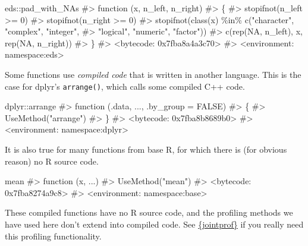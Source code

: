\documentclass[
  letterpaper,
  DIV=11,
  numbers=noendperiod]{scrreprt}
\newenvironment{Shaded}{\begin{snugshade}}{\end{snugshade}}
\newcommand{\CommentTok}[1]{\textcolor[rgb]{0.37,0.37,0.37}{#1}}
\newcommand{\NormalTok}[1]{\textcolor[rgb]{0.00,0.23,0.31}{#1}}
\newcommand{\SpecialCharTok}[1]{\textcolor[rgb]{0.37,0.37,0.37}{#1}}
\begin{document}
\begin{Shaded}
\begin{Highlighting}[]
\NormalTok{eds}\SpecialCharTok{::}\NormalTok{pad\_with\_NAs}
\CommentTok{\#\textgreater{} function (x, n\_left, n\_right) }
\CommentTok{\#\textgreater{} \{}
\CommentTok{\#\textgreater{}     stopifnot(n\_left \textgreater{}= 0)}
\CommentTok{\#\textgreater{}     stopifnot(n\_right \textgreater{}= 0)}
\CommentTok{\#\textgreater{}     stopifnot(class(x) \%in\% c("character", "complex", "integer", }
\CommentTok{\#\textgreater{}         "logical", "numeric", "factor"))}
\CommentTok{\#\textgreater{}     c(rep(NA, n\_left), x, rep(NA, n\_right))}
\CommentTok{\#\textgreater{} \}}
\CommentTok{\#\textgreater{} \textless{}bytecode: 0x7fba8a4a3c70\textgreater{}}
\CommentTok{\#\textgreater{} \textless{}environment: namespace:eds\textgreater{}}
\end{Highlighting}
\end{Shaded}

Some functions use \emph{compiled code} that is written in another
language. This is the case for dplyr's \texttt{arrange()}, which calls
some compiled C++ code.

\begin{Shaded}
\begin{Highlighting}[]
\NormalTok{dplyr}\SpecialCharTok{::}\NormalTok{arrange}
\CommentTok{\#\textgreater{} function (.data, ..., .by\_group = FALSE) }
\CommentTok{\#\textgreater{} \{}
\CommentTok{\#\textgreater{}     UseMethod("arrange")}
\CommentTok{\#\textgreater{} \}}
\CommentTok{\#\textgreater{} \textless{}bytecode: 0x7fba8b8689b0\textgreater{}}
\CommentTok{\#\textgreater{} \textless{}environment: namespace:dplyr\textgreater{}}
\end{Highlighting}
\end{Shaded}

It is also true for many functions from base R, for which there is (for
obvious reason) no R source code.

\begin{Shaded}
\begin{Highlighting}[]
\NormalTok{mean}
\CommentTok{\#\textgreater{} function (x, ...) }
\CommentTok{\#\textgreater{} UseMethod("mean")}
\CommentTok{\#\textgreater{} \textless{}bytecode: 0x7fba8274a9c8\textgreater{}}
\CommentTok{\#\textgreater{} \textless{}environment: namespace:base\textgreater{}}
\end{Highlighting}
\end{Shaded}

These compiled functions have no R source code, and the profiling
methods we have used here don't extend into compiled code. See
\href{https://github.com/r-prof/jointprof}{\{jointprof\}} if you really
need this profiling functionality.
\end{document}
